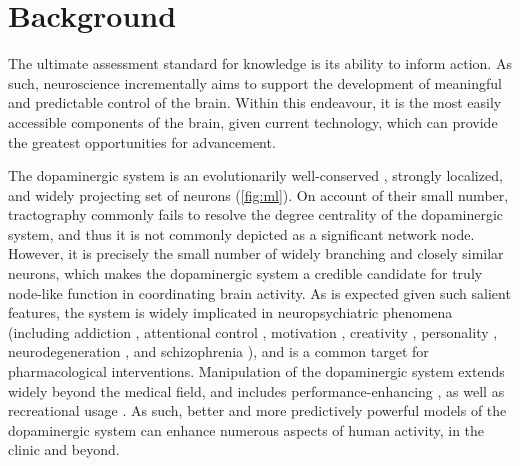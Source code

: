\section{Background}

The ultimate assessment standard for knowledge is its ability to inform action.
As such, neuroscience incrementally aims to support the development of meaningful and predictable control of the brain.
Within this endeavour, it is the most easily accessible components of the brain, given current technology, which can provide the greatest opportunities for advancement.

The dopaminergic system is an evolutionarily well-conserved \cite{Yamamoto2011}, strongly localized, and widely projecting set of neurons (\cref{fig:ml}).
On account of their small number, tractography commonly fails to resolve the degree centrality of the dopaminergic system, and thus it is not commonly depicted as a significant network node.
However, it is precisely the small number of widely branching and closely similar neurons, which makes the dopaminergic system a credible candidate for truly node-like function in coordinating brain activity.
As is expected given such salient features, the system is widely implicated in neuropsychiatric phenomena (including
addiction \cite{DiChiara1988,DiChiara1999},
attentional control \cite{Nieoullon2002},
motivation \cite{Salamone1994},
creativity \cite{Chermahini2010},
personality \cite{Depue1999},
neurodegeneration \cite{Masliah2000},
and schizophrenia \cite{Howes2009}),
and is a common target for pharmacological interventions.
Manipulation of the dopaminergic system extends widely beyond the medical field, and includes performance-enhancing \cite{Mehta2000,Turner2003}, as well as recreational usage \cite{DiChiara1988}.
As such, better and more predictively powerful models of the dopaminergic system can enhance numerous aspects of human activity, in the clinic and beyond.

